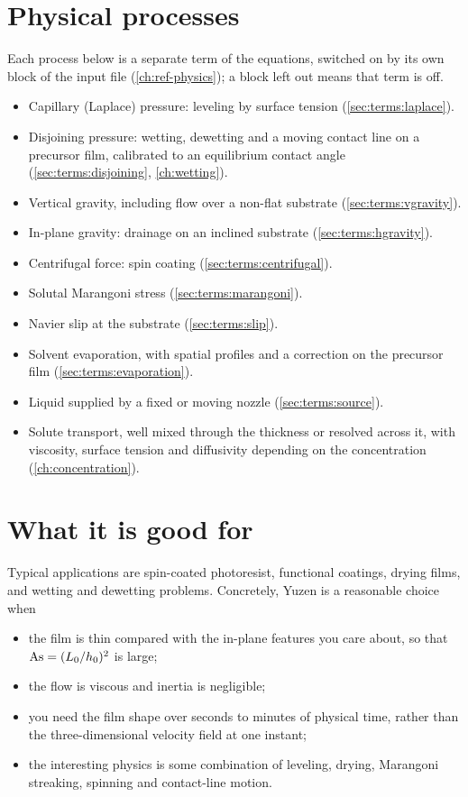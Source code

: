 \section{Physical processes}
\label{sec:intro:physics}

Each process below is a separate term of the equations, switched on by its
own block of the input file (\cref{ch:ref-physics}); a block left out means
that term is off.

\begin{itemize}
  \item Capillary (Laplace) pressure: leveling by surface tension
    (\cref{sec:terms:laplace}).
  \item Disjoining pressure: wetting, dewetting and a moving contact line on a
    precursor film, calibrated to an equilibrium contact angle
    (\cref{sec:terms:disjoining}, \cref{ch:wetting}).
  \item Vertical gravity, including flow over a non-flat substrate
    (\cref{sec:terms:vgravity}).
  \item In-plane gravity: drainage on an inclined substrate
    (\cref{sec:terms:hgravity}).
  \item Centrifugal force: spin coating (\cref{sec:terms:centrifugal}).
  \item Solutal Marangoni stress (\cref{sec:terms:marangoni}).
  \item Navier slip at the substrate (\cref{sec:terms:slip}).
  \item Solvent evaporation, with spatial profiles and a correction on the
    precursor film (\cref{sec:terms:evaporation}).
  \item Liquid supplied by a fixed or moving nozzle (\cref{sec:terms:source}).
  \item Solute transport, well mixed through the thickness or resolved across
    it, with viscosity, surface tension and diffusivity depending on the
    concentration (\cref{ch:concentration}).
\end{itemize}

\section{What it is good for}
\label{sec:intro:uses}

Typical applications are spin-coated photoresist, functional coatings, drying
films, and wetting and dewetting problems. Concretely, Yuzen is a reasonable
choice when

\begin{itemize}
  \item the film is thin compared with the in-plane features you care about,
        so that $\mathrm{As} = (L_0/h_0)^2$ is large;
  \item the flow is viscous and inertia is negligible;
  \item you need the film shape over seconds to minutes of physical time,
        rather than the three-dimensional velocity field at one instant;
  \item the interesting physics is some combination of leveling, drying,
        Marangoni streaking, spinning and contact-line motion.
\end{itemize}

